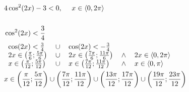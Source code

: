 \documentclass[preview,convert={density=300,outext=.png}]{standalone}
\begin{document}
\begin{align*}
    & 4\cos^2(2x) - 3 < 0, \ \ \ \ x \in \langle 0, 2\pi \rangle \\
    & \\
    & \cos^2(2x) < \frac{3}{4} \\
    & \begin{tabular}{ l l l l l}
        $\cos(2x) < \frac{3}{4}$ & $\cup$ & $\cos(2x) < -\frac{3}{4}$ & &\\
        $2x \in \left(\frac{\pi}{6}; \frac{5\pi}{6}\right)$ & $\cup$ & $2x \in \left(\frac{7\pi}{6}; \frac{11\pi}{6}\right)$ & $\wedge$ & $2x \in \langle 0, 2\pi \rangle$ \\
        $x \in \left(\frac{\pi}{12}; \frac{5\pi}{12}\right)$ & $\cup$ & $x \in \left(\frac{7\pi}{12}; \frac{11\pi}{12}\right)$ & $\wedge$ & $x \in \langle 0, \pi \rangle$\\
    \end{tabular} \\ 
    & x \in \left(\frac{\pi}{12}; \frac{5\pi}{12}\right) \cup \left(\frac{7\pi}{12}; \frac{11\pi}{12}\right) \cup \left(\frac{13\pi}{12}; \frac{17\pi}{12}\right) \cup \left(\frac{19\pi}{12}; \frac{23\pi}{12}\right) \\
\end{align*}
\end{document}
